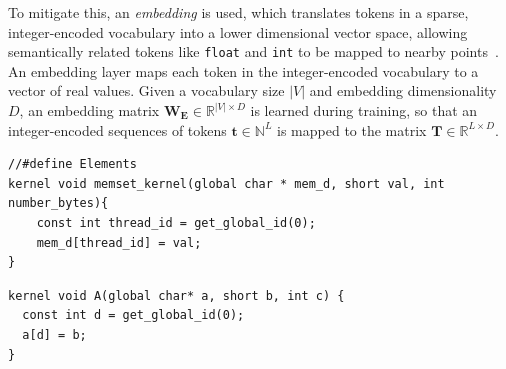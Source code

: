 To mitigate this, an \emph{embedding} is used, which translates tokens in a sparse, integer-encoded vocabulary into a lower dimensional vector space, allowing semantically related tokens like \texttt{float} and \texttt{int} to be mapped to nearby points~\cite{Mikolov2013a,Baroni2014}. An embedding layer maps each token in the integer-encoded vocabulary to a vector of real values. Given a vocabulary size $|V|$ and embedding dimensionality $D$, an embedding matrix $\bm{W_{E}} \in \mathbb{R}^{|V| \times D}$ is learned during training, so that an integer-encoded sequences of tokens $\bm{t} \in \mathbb{N}^{L}$ is mapped to the matrix $\bm{T} \in \mathbb{R}^{L \times D}$. 

\newsavebox{\NvidiaStreamClusterInput}
\begin{lrbox}{\NvidiaStreamClusterInput}
  \begin{minipage}{\textwidth}
    \begin{verbatim}
//#define Elements
kernel void memset_kernel(global char * mem_d, short val, int number_bytes){
    const int thread_id = get_global_id(0);
    mem_d[thread_id] = val;
}
    \end{verbatim}
  \end{minipage}
\end{lrbox}

\newsavebox{\NvidiaStreamClusterOutput}
\begin{lrbox}{\NvidiaStreamClusterOutput}
  \begin{minipage}{\textwidth}
    \begin{verbatim}
kernel void A(global char* a, short b, int c) {
  const int d = get_global_id(0);
  a[d] = b;
}
    \end{verbatim}
  \end{minipage}
\end{lrbox}


